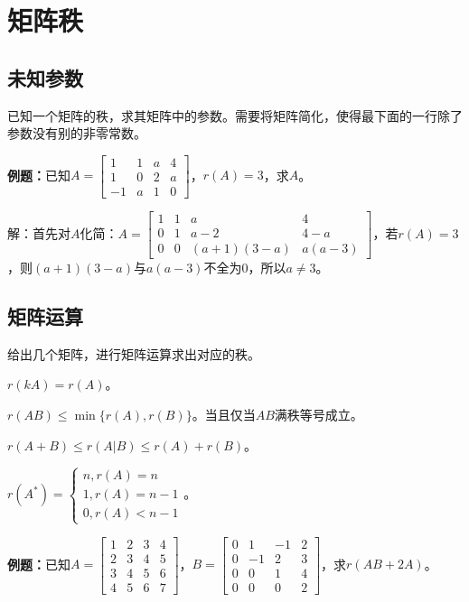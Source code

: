 \documentclass[UTF8, 12pt]{ctexart}
\begin{document}
\section{矩阵秩}

\subsection{未知参数}

已知一个矩阵的秩，求其矩阵中的参数。需要将矩阵简化，使得最下面的一行除了参数没有别的非零常数。

\textbf{例题：}已知$A=\left[\begin{array}{cccc}
    1 & 1 & a & 4 \\
    1 & 0 & 2 & a \\
    -1 & a & 1 & 0
\end{array}\right]$，$r(A)=3$，求$A$。

解：首先对$A$化简：$A=\left[\begin{array}{cccc}
    1 & 1 & a & 4 \\
    0 & 1 & a-2 & 4-a \\
    0 & 0 & (a+1)(3-a) & a(a-3)
\end{array}\right]$，若$r(A)=3$，则$(a+1)(3-a)$与$a(a-3)$不全为0，所以$a\neq3$。

\subsection{矩阵运算}

给出几个矩阵，进行矩阵运算求出对应的秩。

$r(kA)=r(A)$。

$r(AB)\leqslant\min\{r(A),r(B)\}$。当且仅当$AB$满秩等号成立。

$r(A+B)\leqslant r(A|B)\leqslant r(A)+r(B)$。

$r(A^*)=\left\{\begin{array}{l}
    n, r(A)=n \\
    1, r(A)=n-1 \\
    0, r(A)<n-1
\end{array}\right.$。

\textbf{例题：}已知$A=\left[\begin{array}{cccc}
    1 & 2 & 3 & 4 \\
    2 & 3 & 4 & 5 \\
    3 & 4 & 5 & 6 \\
    4 & 5 & 6 & 7
\end{array}\right]$，$B=\left[\begin{array}{cccc}
    0 & 1 & -1 & 2 \\
    0 & -1 & 2 & 3 \\
    0 & 0 & 1 & 4 \\
    0 & 0 & 0 & 2
\end{array}\right]$，求$r(AB+2A)$。
\end{document}
